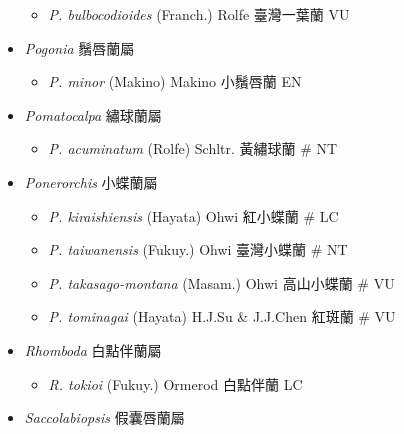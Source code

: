 \begin{itemize}
  \begin{itemize}
        \item[] \textit{P. bulbocodioides} (Franch.) Rolfe  臺灣一葉蘭   VU
  \end{itemize}
 \item[] \textit{Pogonia} 鬚唇蘭屬
                                
  \begin{itemize}
        \item[] \textit{P. minor} (Makino) Makino  小鬚唇蘭   EN
  \end{itemize}
 \item[] \textit{Pomatocalpa} 繡球蘭屬
                                
  \begin{itemize}
        \item[] \textit{P. acuminatum} (Rolfe) Schltr.  黃繡球蘭  \# NT
  \end{itemize}
 \item[] \textit{Ponerorchis} 小蝶蘭屬
                                
  \begin{itemize}
        \item[] \textit{P. kiraishiensis} (Hayata) Ohwi  紅小蝶蘭  \# LC
        \item[] \textit{P. taiwanensis} (Fukuy.) Ohwi  臺灣小蝶蘭  \# NT
        \item[] \textit{P. takasago-montana} (Masam.) Ohwi  高山小蝶蘭  \# VU
        \item[] \textit{P. tominagai} (Hayata) H.J.Su \& J.J.Chen  紅斑蘭  \# VU
  \end{itemize}
 \item[] \textit{Rhomboda} 白點伴蘭屬
                                
  \begin{itemize}
        \item[] \textit{R. tokioi} (Fukuy.) Ormerod  白點伴蘭   LC
  \end{itemize}
 \item[] \textit{Saccolabiopsis} 假囊唇蘭屬
                                

\end{itemize}
